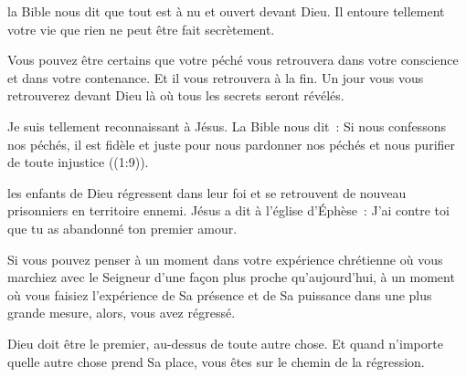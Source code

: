 la Bible nous dit que tout est à nu et ouvert devant Dieu.
 Il entoure tellement votre vie que rien ne peut être fait secrètement.

Vous pouvez être certains que votre péché vous retrouvera
 dans votre conscience et dans votre contenance.
 Et il vous retrouvera à la fin.
 Un jour vous vous retrouverez devant Dieu
 là où tous les secrets seront révélés.

Je suis tellement reconnaissant à Jésus. La Bible nous dit~:
 \og Si nous confessons nos péchés, il est fidèle et juste
 pour nous pardonner nos péchés et nous purifier
 de toute injustice \fg{} ((1:9)). 

\dvrule






 les enfants de Dieu régressent dans leur foi
 et se retrouvent de nouveau prisonniers en territoire ennemi.
 Jésus a dit à l'église d'Éphèse~:
 \og J'ai contre toi que tu as abandonné ton premier amour. \fg{}

Si vous pouvez penser à un moment dans votre expérience chrétienne
 où vous marchiez avec le Seigneur d'une façon plus proche qu'aujourd'hui,
 à un moment où vous faisiez l'expérience de Sa présence et de Sa puissance
 dans une plus grande mesure, alors, vous avez régressé.


Dieu doit être le premier, au-dessus de toute autre chose.
 Et quand n'importe quelle autre chose prend Sa place,
 vous êtes sur le chemin de la régression.

